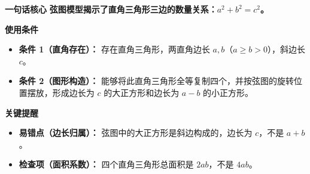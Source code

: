 \begin{summarybox}
	\textbf{\textcolor{CSummary}{一句话核心}}
	\textbf{弦图模型揭示了直角三角形三边的数量关系：$a^2+b^2=c^2$。}

	\medskip
	\textbf{\textcolor{CSummary}{使用条件}}
	\begin{itemize}[leftmargin=*, itemsep=0.5em, topsep=0.4em]
		\item \textbf{条件 1（直角存在）：} 存在直角三角形，两直角边长 $a,b$（$a\ge b>0$），斜边长 $c$。
		\item \textbf{条件 2（图形构造）：} 能够将此直角三角形全等复制四个，并按弦图的旋转位置摆放，形成边长为 $c$ 的大正方形和边长为 $a-b$ 的小正方形。
	\end{itemize}

	\medskip
	\textbf{\textcolor{CSummary}{关键提醒}}
	\begin{itemize}[leftmargin=*, itemsep=0.5em, topsep=0.4em]
		\item \textbf{易错点（边长归属）：} 弦图中的大正方形是斜边构成的，边长为 $c$，不是 $a+b$。
		\item \textbf{检查项（面积系数）：} 四个直角三角形总面积是 $2ab$，不是 $4ab$。
	\end{itemize}

\end{summarybox}
